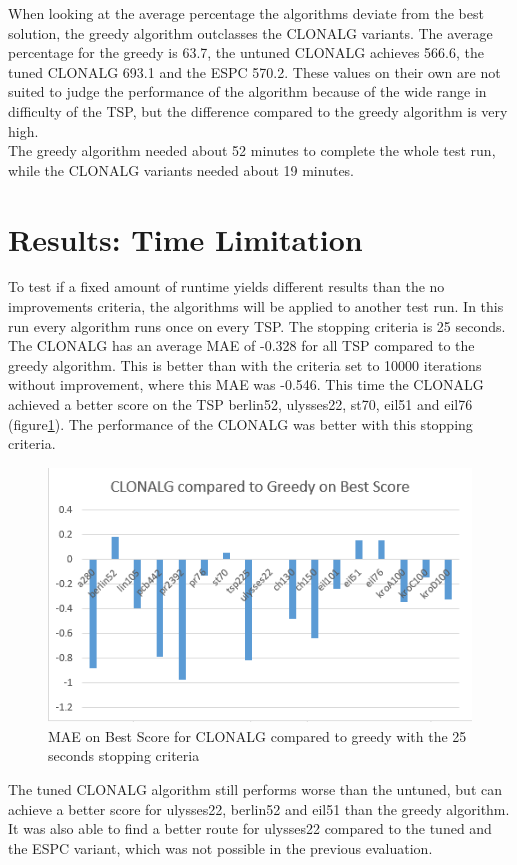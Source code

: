 When looking at the average percentage the algorithms deviate from the best solution, the greedy algorithm outclasses the CLONALG variants. The average percentage for the greedy is 63.7, the untuned CLONALG achieves 566.6, the tuned CLONALG 693.1 and the ESPC 570.2. These values on their own are not suited to judge the performance of the algorithm because of the wide range in difficulty of the TSP, but the difference compared to the greedy algorithm is very high.\\ The greedy algorithm needed about 52 minutes to complete the whole test run, while the CLONALG variants needed about 19 minutes.
\section{Results: Time Limitation}
To test if a fixed amount of runtime yields different results than the no improvements criteria, the algorithms will be applied to another test run. In this run every algorithm runs once on every TSP. The stopping criteria is 25 seconds.\\
The CLONALG has an average MAE of -0.328 for all TSP compared to the greedy algorithm. This is better than with the criteria set to 10000 iterations without improvement, where this MAE was -0.546. This time the CLONALG achieved a better score on the TSP berlin52, ulysses22, st70, eil51 and eil76 (figure\ref{CLONALG_Time}). The performance of the CLONALG was better with this stopping criteria.
\begin{figure}[H]
	\includegraphics[]{Images/CLONALG_Time.png}
	\caption{MAE on Best Score for CLONALG compared to greedy with the 25 seconds stopping criteria}
	\label{CLONALG_Time}
\end{figure}
The tuned CLONALG algorithm still performs worse than the untuned, but can achieve a better score for ulysses22, berlin52 and eil51 than the greedy algorithm. It was also able to find a better route for ulysses22 compared to the tuned and the ESPC variant, which was not possible in the previous evaluation.\\
